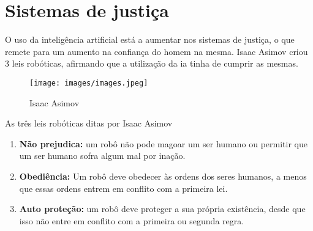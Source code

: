 \documentclass[a4paper, 11pt, onecolumn, oneside]{report}
\begin{document}
\section{Sistemas de justiça}
O uso da inteligência artificial está a aumentar nos sistemas de justiça, o que remete para um aumento na confiança do homem na mesma. Isaac Asimov criou 3 leis 
robóticas, afirmando que a utilização da \ac{ia} tinha de cumprir as mesmas. 
%
\begin{figure}[ht]
\centering
\texttt{[image: images/images.jpeg]}
\caption{Isaac Asimov\cite{i46}}
\label{Isaac Asimov}
\end{figure}
\par
\par
As três leis robóticas ditas por Isaac Asimov \cite{isaac} 
\begin{enumerate}
    \item \textbf{Não prejudica:} um robô não pode magoar um ser humano ou permitir que um ser humano sofra algum mal por inação. 
    \item \textbf{Obediência:} Um robô deve obedecer às ordens dos seres humanos, a menos que essas ordens entrem em conflito com a primeira lei.
    \item \textbf{Auto proteção:} um robô deve proteger a sua própria existência, desde que isso não entre em conflito com a primeira ou segunda regra.
\end{enumerate}
%


%
%
\end{document}
